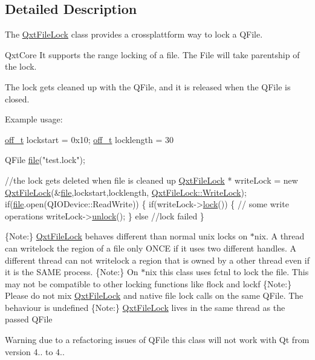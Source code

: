 \subsection{Detailed Description}
The \hyperlink{class_qxt_file_lock}{Qxt\-File\-Lock} class provides a crossplattform way to lock a Q\-File. 

Qxt\-Core It supports the range locking of a file. The File will take parentship of the lock.\par
 The lock gets cleaned up with the Q\-File, and it is released when the Q\-File is closed.\par


Example usage\-: 
\begin{DoxyCode}
\hyperlink{qxtfilelock_8h_af83497edef361523a95b06deda0b4c2d}{off\_t} lockstart = 0x10;
\hyperlink{qxtfilelock_8h_af83497edef361523a95b06deda0b4c2d}{off\_t} locklength = 30

QFile \hyperlink{class_qxt_file_lock_afeaea618cc084130c70c6b6f93b4b2f3}{file}(\textcolor{stringliteral}{"test.lock"});

\textcolor{comment}{//the lock gets deleted when file is cleaned up}
\hyperlink{class_qxt_file_lock}{QxtFileLock} * writeLock = \textcolor{keyword}{new} \hyperlink{class_qxt_file_lock_abd47ac230f3f7119531d4efcfda30a97}{QxtFileLock}(&\hyperlink{class_qxt_file_lock_afeaea618cc084130c70c6b6f93b4b2f3}{file},lockstart,locklength,
      \hyperlink{class_qxt_file_lock_a98ad3e1055038fd611ad64755f794835aa65a3bba221d8823412b16746b5a8c17}{QxtFileLock::WriteLock});
\textcolor{keywordflow}{if}(\hyperlink{class_qxt_file_lock_afeaea618cc084130c70c6b6f93b4b2f3}{file}.open(QIODevice::ReadWrite))
\{
    \textcolor{keywordflow}{if}(writeLock->\hyperlink{class_qxt_file_lock_a84af0691c49c83fb6d3c3352c56ba48f}{lock}())
    \{
         \textcolor{comment}{// some write operations}
        writeLock->\hyperlink{class_qxt_file_lock_ae9e31b41e41520c29cf64634d099cf05}{unlock}();
    \}
     \textcolor{keywordflow}{else}
         \textcolor{comment}{//lock failed}
\}
\end{DoxyCode}
  \{Note\-:\} \hyperlink{class_qxt_file_lock}{Qxt\-File\-Lock} behaves different than normal unix locks on $\ast$nix. A thread can writelock the region of a file only O\-N\-C\-E if it uses two different handles. A different thread can not writelock a region that is owned by a other thread even if it is the S\-A\-M\-E process.  \{Note\-:\} On $\ast$nix this class uses fctnl to lock the file. This may not be compatible to other locking functions like flock and lockf  \{Note\-:\} Please do not mix \hyperlink{class_qxt_file_lock}{Qxt\-File\-Lock} and native file lock calls on the same Q\-File. The behaviour is undefined  \{Note\-:\} \hyperlink{class_qxt_file_lock}{Qxt\-File\-Lock} lives in the same thread as the passed Q\-File \begin{DoxyWarning}{Warning}
due to a refactoring issues of Q\-File this class will not work with Qt from version 4.. to 4.. 
\end{DoxyWarning}


